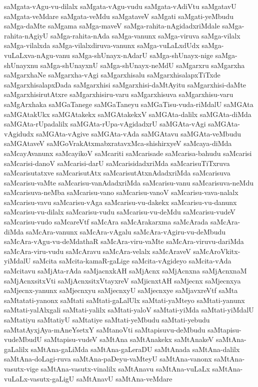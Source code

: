 {saMgata-vAgu-vu-dilalx
saMgata-vAgu-vudu
saMgata-vAdiVtu
saMgatavU
saMgata-veMdare
saMgata-veMdu
saMgataveV
saMgati
saMgati-yeMbudu
saMga-daMte
saMgama
saMga-maveV
saMga-rahita-nAgidadxriMdale
saMga-rahita-nAgiyU
saMga-rahita-nAda
saMga-vanunx
saMga-viruva
saMga-vilalx
saMga-vilalxda
saMga-vilalxdiruva-vanunx
saMga-vuLaLxdUdx
saMga-vuLaLxva-nAgu-vanu
saMga-shUnayx-nAdarU
saMga-shUnayx-nige
saMga-shUnayxnu
saMga-shUnayxnU
saMga-shUnayx-neMdU
saMgarxru
saMgarxha
saMgarxhaNe
saMgarxha-vAgi
saMgarxhisalu
saMgarxhisalapxTiTxde
saMgarxhisalapxDada
saMgarxhisi
saMgarxhisi-daMtAyitu
saMgarxhisi-daMte
saMgarxhisirutAtxre
saMgarxhisiru-varu
saMgarxhisuva
saMgarxhisu-varu
saMgArxhaka
saMGaTanege
saMGaTaneyu
saMGaTisu-vuda-riMdalU
saMGAta
saMGAtakUkx
saMGAtakekx
saMGAtakekxV
saMGAta-dalilx
saMGAta-diMda
saMGAta-rUpadalilx
saMGAta-rUpa-vAgidadxrU
saMGAta-vAgi
saMGAta-vAgidudx
saMGAta-vAgive
saMGAta-vAda
saMGAtavu
saMGAta-veMbudu
saMGAtaveV
saMGoVrakAtxmabxratavxMca-shishirxyeV
saMcaya-diMda
saMcayAvanunx
saMcayikoV
saMcariti
saMcarisade
saMcarisa-bahudu
saMcarisi
saMcarisi-danoV
saMcarisi-darU
saMcarisidadxriMda
saMcarisuTiTxruva
saMcarisutatxve
saMcarisutAtx
saMcarisutAtxnAdadxriMda
saMcarisuva
saMcarisu-vaMte
saMcarisu-vanAdadxriMda
saMcarisu-vanu
saMcarisuva-neMdu
saMcarisuva-neMba
saMcarisu-vano
saMcarisu-vanoV
saMcarisu-vava-nalalx
saMcarisu-vavu
saMcarisu-vAga
saMcarisu-vu-dakekx
saMcarisu-vu-danunx
saMcarisu-vu-dilalx
saMcarisu-vudu
saMcarisu-vu-deMdu
saMcarisu-vudeV
saMcarisu-vudo
saMcareVtf
saMcAra
saMcArakarxma
saMcArada
saMcAra-diMda
saMcAra-vanunx
saMcAra-vAgalu
saMcAra-vAgiru-vu-deMbudu
saMcAra-vAgu-vu-deMdathaR
saMcAra-viru-vaMte
saMcAra-viruvu-dariMda
saMcAra-viru-vudu
saMcAravu
saMcAra-velalx
saMcAraveV
saMcAroVkitx-yiMdalU
saMcita
saMcita-kamaR-gaLige
saMcita-vAgideyo
saMcita-vAda
saMcitavu
saMjAta-rAda
saMjacnxkAH
saMjAcnx
saMjAcnxna
saMjAcnxnaM
saMjAcnxsitxVti
saMjAcnxsitxVtayxreV
saMjicnxtAH
saMjecnx
saMjecnxya
saMjecnx-yanunx
saMjecnxyu
saMjecnxyU
saMjecnxye
saMjavxreVtf
saMta
saMtatati-yanonx
saMtati
saMtati-gaLalUlx
saMtati-yaMteyo
saMtati-yanunx
saMtati-yalAlxgali
saMtati-yalilx
saMtati-yaloV
saMtati-yiMda
saMtati-yiMdalU
saMtatiyu
saMtatiyU
saMtatiye
saMtati-yeMbudu
saMtati-yebudu
saMtatAyxjAya-mAneYsetxY
saMtanoVti
saMtapisuvu-deMbudu
saMtapisu-vudeMbudU
saMtapisu-vudeV
saMtAna
saMtAnakekx
saMtAnakeV
saMtAna-gaLalilx
saMtAna-gaLiMda
saMtAna-gaLeraDU
saMtAnada
saMtAna-dalilx
saMtAna-doLagi-ruva
saMtAna-paDeyu-vaMteyU
saMtAna-vanonx
saMtAna-vasutx-vige
saMtAna-vasutx-vinalilx
saMtAnavu
saMtAna-vuLaLx
saMtAna-vuLaLx-vasutx-gaLigU
saMtAnavU
saMtAna-veMdare
}
